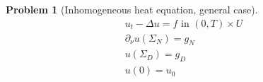 \documentclass[english,a4paper,10pt,oneside]{scrbook}	%
\theoremstyle{break}
\newtheorem{thm}[equation]{Theorem}
\newtheorem{pb}[equation]{Problem}
\newenvironment{mproof}[1][\proofname]{%
  \begin{proof}[#1]$ $\par\nobreak\ignorespaces
}{%
  \end{proof}
}
\renewcommand*{\proofname}{Proof}
\theoremstyle{remark}
\newcommand{\norm}[1]{\left\lVert#1\right\rVert}
\newcommand{\HN}[1]{\norm{#1}_{H}}
\newcommand{\tr}{\text{tr}}
\begin{document}
\begin{appendices}
%
%
%
%
%
%
%
%
%
%
%
%
%
%
%
%


%

\begin{pb}[Inhomogeneous heat equation, general case]
\label{pb:mix}
\begin{align*}
u_t - \Delta u = f \text{ in } (0,T)\times U\\
\partial_\nu u(\Sigma_N)=g_N\\
u(\Sigma_D)=g_D\\
u(0)=u_0
\end{align*}


\end{pb}
\end{appendices}
\end{document}
